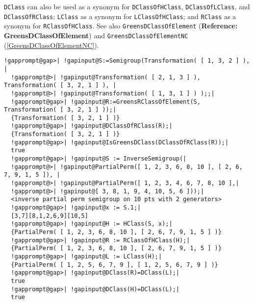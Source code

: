 \documentclass[a4paper,11pt]{report}
\begin{document}
{{{ \texttt{DClass} can also be used as a synonym for \texttt{DClassOfHClass}, \texttt{DClassOfLClass}, and \texttt{DClassOfRClass}; \texttt{LClass} as a synonym for \texttt{LClassOfHClass}; and \texttt{RClass} as a synonym for \texttt{RClassOfHClass}. See also \texttt{GreensDClassOfElement} (\textbf{Reference: GreensDClassOfElement}) and \texttt{GreensDClassOfElementNC} (\ref{GreensDClassOfElementNC}). 
\begin{Verbatim}[commandchars=!@|,fontsize=\small,frame=single,label=Example]
  !gapprompt@gap>| !gapinput@S:=Semigroup(Transformation( [ 1, 3, 2 ] ), |
  !gapprompt@>| !gapinput@Transformation( [ 2, 1, 3 ] ), Transformation( [ 3, 2, 1 ] ), |
  !gapprompt@>| !gapinput@Transformation( [ 1, 3, 1 ] ) );;|
  !gapprompt@gap>| !gapinput@R:=GreensRClassOfElement(S, Transformation( [ 3, 2, 1 ] ));|
  {Transformation( [ 3, 2, 1 ] )}
  !gapprompt@gap>| !gapinput@DClassOfRClass(R);|
  {Transformation( [ 3, 2, 1 ] )}
  !gapprompt@gap>| !gapinput@IsGreensDClass(DClassOfRClass(R));|
  true
  !gapprompt@gap>| !gapinput@S := InverseSemigroup(|
  !gapprompt@>| !gapinput@PartialPerm([ 1, 2, 3, 6, 8, 10 ], [ 2, 6, 7, 9, 1, 5 ]), |
  !gapprompt@>| !gapinput@PartialPerm([ 1, 2, 3, 4, 6, 7, 8, 10 ],|
  !gapprompt@>| !gapinput@[ 3, 8, 1, 9, 4, 10, 5, 6 ]));|
  <inverse partial perm semigroup on 10 pts with 2 generators>
  !gapprompt@gap>| !gapinput@x := S.1;|
  [3,7][8,1,2,6,9][10,5]
  !gapprompt@gap>| !gapinput@H := HClass(S, x);|
  {PartialPerm( [ 1, 2, 3, 6, 8, 10 ], [ 2, 6, 7, 9, 1, 5 ] )}
  !gapprompt@gap>| !gapinput@R := RClassOfHClass(H);|
  {PartialPerm( [ 1, 2, 3, 6, 8, 10 ], [ 2, 6, 7, 9, 1, 5 ] )}
  !gapprompt@gap>| !gapinput@L := LClass(H);|
  {PartialPerm( [ 1, 2, 5, 6, 7, 9 ], [ 1, 2, 5, 6, 7, 9 ] )}
  !gapprompt@gap>| !gapinput@DClass(R)=DClass(L);|
  true
  !gapprompt@gap>| !gapinput@DClass(H)=DClass(L);|
  true
\end{Verbatim}
 }

 
}}
\end{document}
